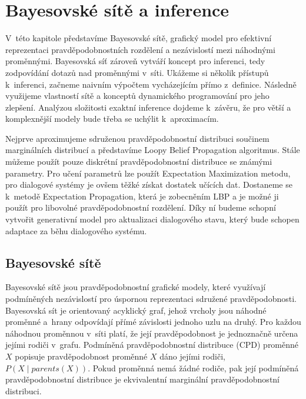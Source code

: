 \chapter{Bayesovské sítě a inference}
\label{ch:kap2}

V~této kapitole představíme Bayesovské sítě, grafický model pro efektivní reprezentaci pravděpodobnostních rozdělení a nezávislostí mezi náhodnými proměnnými.
Bayesovská síť zároveň vytváří koncept pro inferenci, tedy zodpovídání dotazů nad proměnnými v~síti.
Ukážeme si několik přístupů k~inferenci, začneme naivním výpočtem vycházejícím přímo z~definice.
Následně využijeme vlastností sítě a konceptů dynamického programování pro jeho zlepšení.
Analýzou složitosti exaktní inference dojdeme k~závěru, že pro větší a komplexnější modely bude třeba se uchýlit k~aproximacím.

Nejprve aproximujeme sdruženou pravděpodobnostní distribuci součinem marginálních distribucí a představíme Loopy Belief Propagation algoritmus.
Stále můžeme použít pouze diskrétní pravděpodobnostní distribuce se známými parametry.
Pro učení parametrů lze použít Expectation Maximization metodu, pro dialogové systémy je ovšem těžké získat dostatek učících dat.
Dostaneme se k~metodě Expectation Propagation, která je zobecněním LBP a je možné ji použít pro libovolné pravděpodobnostní rozdělení.
Díky ní budeme schopní vytvořit generativní model pro aktualizaci dialogového stavu, který bude schopen adaptace za běhu dialogového systému.

\section{Bayesovské sítě}
\label{sec:bn}

Bayesovské sítě jsou pravděpodobnostní grafické modely, které využívají podmíněných nezávislostí pro úspornou reprezentaci sdružené pravděpodobnosti.
Bayesovská sít je orientovaný acyklický graf, jehož vrcholy jsou náhodné proměnné a~hrany odpovídají přímé závislosti jednoho uzlu na druhý.
Pro každou náhodnou proměnnou v~síti platí, že její pravděpodobnost je jednoznačně určena jejími rodiči v~grafu.
Podmíněná pravděpodobnostní distribuce (CPD) proměnné $X$ popisuje pravděpodobnost proměnné $X$ dáno jejími rodiči, $P(X \mid parents(X))$.
Pokud proměnná nemá žádné rodiče, pak její podmíněná pravděpodobnostní distribuce je ekvivalentní marginální pravděpodobnostní distribuci.

